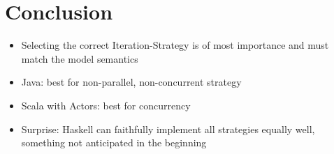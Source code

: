 \section{Conclusion}
\begin{itemize}
	\item Selecting the correct Iteration-Strategy is of most importance and must match the model semantics
	\item Java: best for non-parallel, non-concurrent strategy
	\item Scala with Actors: best for concurrency
	\item Surprise: Haskell can faithfully implement all strategies equally well, something not anticipated in the beginning
\end{itemize} 
